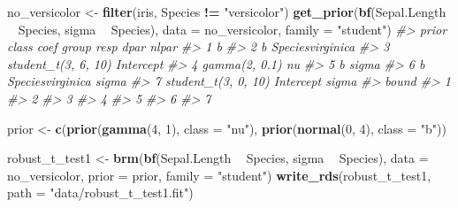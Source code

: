 \documentclass[]{book}
\newenvironment{Shaded}{\begin{snugshade}}{\end{snugshade}}
\newcommand{\KeywordTok}[1]{\textcolor[rgb]{0.13,0.29,0.53}{\textbf{#1}}}
\newcommand{\DataTypeTok}[1]{\textcolor[rgb]{0.13,0.29,0.53}{#1}}
\newcommand{\DecValTok}[1]{\textcolor[rgb]{0.00,0.00,0.81}{#1}}
\newcommand{\StringTok}[1]{\textcolor[rgb]{0.31,0.60,0.02}{#1}}
\newcommand{\CommentTok}[1]{\textcolor[rgb]{0.56,0.35,0.01}{\textit{#1}}}
\newcommand{\OperatorTok}[1]{\textcolor[rgb]{0.81,0.36,0.00}{\textbf{#1}}}
\newcommand{\NormalTok}[1]{#1}
\begin{document}
\begin{Shaded}
\begin{Highlighting}[]
\NormalTok{no_versicolor <-}\StringTok{ }\KeywordTok{filter}\NormalTok{(iris, Species }\OperatorTok{!=}\StringTok{ "versicolor"}\NormalTok{)}
\KeywordTok{get_prior}\NormalTok{(}\KeywordTok{bf}\NormalTok{(Sepal.Length }\OperatorTok{~}\StringTok{ }\NormalTok{Species, sigma }\OperatorTok{~}\StringTok{ }\NormalTok{Species), }
          \DataTypeTok{data =}\NormalTok{ no_versicolor, }
          \DataTypeTok{family =} \StringTok{"student"}\NormalTok{)}
\CommentTok{#>                 prior     class             coef group resp  dpar nlpar}
\CommentTok{#> 1                             b                                        }
\CommentTok{#> 2                             b Speciesvirginica                       }
\CommentTok{#> 3 student_t(3, 6, 10) Intercept                                        }
\CommentTok{#> 4       gamma(2, 0.1)        nu                                        }
\CommentTok{#> 5                             b                             sigma      }
\CommentTok{#> 6                             b Speciesvirginica            sigma      }
\CommentTok{#> 7 student_t(3, 0, 10) Intercept                             sigma      }
\CommentTok{#>   bound}
\CommentTok{#> 1      }
\CommentTok{#> 2      }
\CommentTok{#> 3      }
\CommentTok{#> 4      }
\CommentTok{#> 5      }
\CommentTok{#> 6      }
\CommentTok{#> 7}
\end{Highlighting}
\end{Shaded}

\begin{Shaded}
\begin{Highlighting}[]
\NormalTok{prior <-}\StringTok{ }\KeywordTok{c}\NormalTok{(}\KeywordTok{prior}\NormalTok{(}\KeywordTok{gamma}\NormalTok{(}\DecValTok{4}\NormalTok{, }\DecValTok{1}\NormalTok{), }\DataTypeTok{class =} \StringTok{"nu"}\NormalTok{),}
           \KeywordTok{prior}\NormalTok{(}\KeywordTok{normal}\NormalTok{(}\DecValTok{0}\NormalTok{, }\DecValTok{4}\NormalTok{), }\DataTypeTok{class =} \StringTok{"b"}\NormalTok{))}
\end{Highlighting}
\end{Shaded}

\begin{Shaded}
\begin{Highlighting}[]
\NormalTok{robust_t_test1 <-}\StringTok{ }\KeywordTok{brm}\NormalTok{(}\KeywordTok{bf}\NormalTok{(Sepal.Length }\OperatorTok{~}\StringTok{ }\NormalTok{Species, sigma }\OperatorTok{~}\StringTok{ }\NormalTok{Species), }
            \DataTypeTok{data =}\NormalTok{ no_versicolor, }
            \DataTypeTok{prior =}\NormalTok{ prior, }
            \DataTypeTok{family =} \StringTok{"student"}\NormalTok{)}
\KeywordTok{write_rds}\NormalTok{(robust_t_test1, }\DataTypeTok{path =} \StringTok{"data/robust_t_test1.fit"}\NormalTok{)}
\end{Highlighting}
\end{Shaded}
\end{document}
